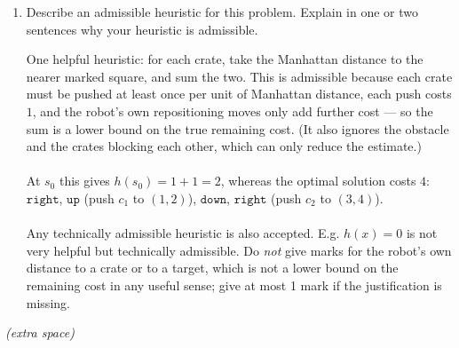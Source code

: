 \begin{enumerate}
\begin{enumerate}
\begin{solution}
      \begin{itemize}
        \item If $n$ is off the grid or is the obstacle $(2,1)$: no successor.
        \item If $n$ is empty: successor is the same state with $p_R \leftarrow n$.
        \item If $n$ holds a crate: the move is legal only if $b$ is on the grid, is not the obstacle, and does not hold the other crate. If so, the successor sets $p_R \leftarrow n$ and moves that crate to $b$; otherwise there is no successor in that direction.
      \end{itemize}
      Every successor has cost $1$.
      \\~\\
      Marking scheme: 1 mark for the ordinary-move case and the grid/obstacle bounds; 1 mark for correct push semantics (checking the cell \emph{beyond} the crate, including the other crate blocking it). Only 1 mark total if the student describes only the robot's movement and never updates the crate positions.
  \end{solution}
  \item \points[2] Describe an admissible heuristic for this problem.
        Explain in one or two sentences why your heuristic is admissible.
  \begin{solution}
  One helpful heuristic: for each crate, take the Manhattan distance to the nearer marked square, and sum the two. This is admissible because each crate must be pushed at least once per unit of Manhattan distance, each push costs $1$, and the robot's own repositioning moves only add further cost --- so the sum is a lower bound on the true remaining cost. (It also ignores the obstacle and the crates blocking each other, which can only reduce the estimate.)
  \\~\\
  At $s_0$ this gives $h(s_0) = 1 + 1 = 2$, whereas the optimal solution costs $4$:
  $\texttt{right}$, $\texttt{up}$ (push $c_1$ to $(1,2)$), $\texttt{down}$, $\texttt{right}$ (push $c_2$ to $(3,4)$).
  \\~\\
  Any technically admissible heuristic is also accepted. E.g. $h(x)=0$ is not very helpful but technically admissible. Do \emph{not} give marks for the robot's own distance to a crate or to a target, which is not a lower bound on the remaining cost in any useful sense; give at most 1 mark if the justification is missing.
  \end{solution}
  \end{enumerate}
\end{enumerate}
\clearpage
\begin{center}
    \textit{(extra space)}
\end{center}
\clearpage
